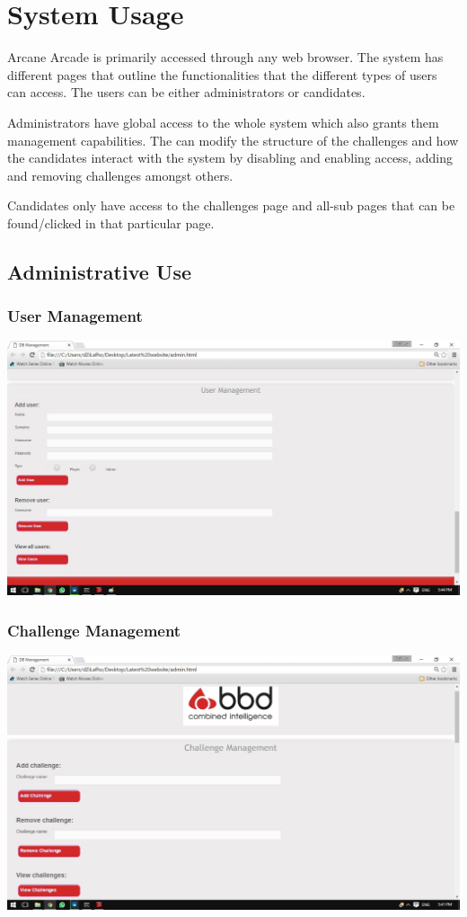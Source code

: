 \documentclass[english]{article}
\begin{document}
	
	
	\section{System Usage}
	Arcane Arcade is primarily accessed through any web browser. The system has different pages that outline the functionalities that the different types of users can access. The users can be either administrators or candidates. 
		
	Administrators have global access to the whole system which also grants them management capabilities. The can modify the structure of the challenges and how the candidates interact with the system by disabling and enabling access, adding and removing challenges amongst others.
		
	Candidates only have access to the challenges page and all-sub pages that can be found/clicked in that particular page.
	
		\subsection{Administrative Use}
			\subsubsection{User Management}
				\includegraphics[width=\linewidth]{UserManagement.jpg}
			\subsubsection{Challenge Management}
				\includegraphics[width=\linewidth]{challengeManagement.jpg}
\end{document}
